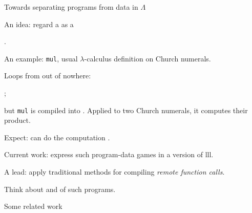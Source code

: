 \documentclass[12pt,fleqn,landscape]{article}
\begin{document}

\begin{slide}{Towards separating programs from data in $\Lambda$}


\be

\item An idea: regard a  as a

\hfill {}.
\vair

\item An example: {\tt mul},  usual $\lambda$-calculus definition on Church numerals. 
\vair

\item Loops from out of nowhere:
\bi
\item {}; 
\vair

\item but  {\tt mul} is compiled  into . Applied to two Church numerals, it  computes their product.
\vair

\item Expect: can do the computation  .
\ei
\vair

\item Current work: express such program-data games in a  version of {\sc lll}. 

A  lead: apply traditional methods for compiling  {\em remote function calls}.

\vair

\item Think about  and  of such programs.

\ee






\end{slide}





\begin{slide}{Some related work}

\vspace{-25mm}


\nocite{*}

\end{slide}
\end{document}
